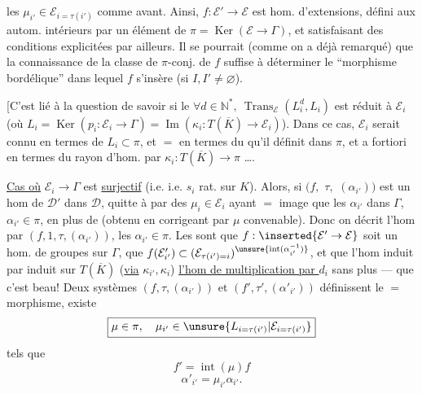 
les $\mu_{i'}\in\mathcal E_{i=\tau(i')}$ comme avant. Ainsi, $f:\mathcal E'\to\mathcal E$ est   hom. d'extensions, défini aux autom. intérieurs par un élément de $\pi=\operatorname{Ker}(\mathcal E\to\Gamma)$, et satisfaisant des conditions explicitées par ailleurs.
Il se pourrait (comme on a déjà remarqué) que la connaissance de la classe de $\pi$-conj. de $f$ suffise à déterminer le ``morphisme bordélique'' dans lequel $f$ s'insère (si $I,I'\ne\varnothing$).

[C'est lié à la question de savoir si le  $\forall d\in\mathbb N^*,\ \operatorname{Trans}_{\mathcal E}(L_i^d,L_i)$ est réduit à $\mathcal E_i$ (où $L_i=\operatorname{Ker}(p_i:\mathcal E_i\to\Gamma)=\operatorname{Im}(\kappa_i:T(\overline K)\to\mathcal E_i)$).
Dans ce cas, $\mathcal E_i$ serait connu en termes de $L_i\subset\pi$, et $=$ en termes du  qu'il définit dans $\pi$, et a fortiori en termes du rayon d'hom.  par $\kappa_i:T(\overline K)\to\pi$ \ldots.


\uline{Cas où}  $\mathcal E_i\to\Gamma$ est \uline{surjectif} (i.e.   i.e. $s_i$ rat. sur $K$).
Alors, si $(f,$ \deleted{\unsure{$\alpha$,}} $\tau,$  $(\alpha_{i'}))$ est un hom de $\mathcal D'$ dans $\mathcal D$,  quitte à   par des $\mu_i\in\mathcal E_i$ ayant $=$ image que les $\alpha_{i'}$ dans $\Gamma$,  $\alpha_{i'}\in\pi$, en plus de  (obtenu en corrigeant par $\mu$ convenable).
Donc on décrit l'hom  par $(f,1,\tau,(\alpha_{i'}))$, les $\alpha_{i'}\in\pi$. Les    sont que $f:\inserted{\mathcal E'\to\mathcal E}$ soit un hom. de groupes sur $\Gamma$, que  $f(\mathcal E'_{i'})\subset(\mathcal E_{\tau(i')=i})^{\unsure{\operatorname{int}(\alpha_{i'}^{-1})}}$, et que l'hom induit  par    induit sur $T(\overline K)$ (\uline{via} $\kappa_{i'},\kappa_i$) \uline{l'hom de multiplication par $d_i$} sans plus --- que c'est beau!
Deux systèmes $(f,\tau,(\alpha_{i'}))$ et $(f',\tau',(\alpha'_{i'}))$ définissent le $=$ morphisme,   existe
\[
 \boxed{\mu\in\pi,\quad\mu_{i'}\in\unsure{L_{i=\tau(i')}|\mathcal E_{i=\tau(i')}}}
\]
tels que
\[
 f'=\operatorname{int}(\mu)f
\]
\[
 \alpha'_{i'}=\mu_{i'}\alpha_{i'}.
\]

